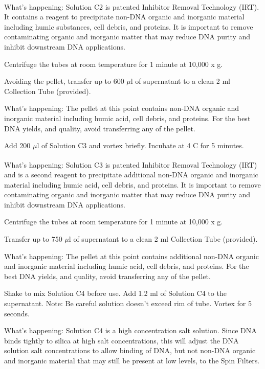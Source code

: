 \documentclass[12pt]{../SOP4_alpha}\usepackage[]{graphicx}\usepackage[]{xcolor}
\begin{document}
What's happening: Solution C2 is patented Inhibitor Removal Technology\textsuperscript{\textregistered} (IRT). It contains a reagent to precipitate non-DNA organic and inorganic material including humic substances, cell debris, and proteins. It is important to remove contaminating organic and inorganic matter that may reduce
DNA purity and inhibit downstream DNA applications.

\NP Centrifuge the tubes at room temperature for 1 minute at 10,000 x g.

\NP Avoiding the pellet, transfer up to 600 $\mu$l of supernatant to a clean 2 ml Collection Tube (provided).

\noindent What's happening: The pellet at this point contains non-DNA organic and inorganic material including humic acid, cell debris, and proteins. For the best DNA yields, and quality, avoid transferring any of the pellet.

\NP Add 200 $\mu$l of Solution C3 and vortex briefly. Incubate at 4 \degree C for 5 minutes.

\noindent What's happening: Solution C3 is patented Inhibitor Removal Technology\textsuperscript{\textregistered} (IRT) and is a second reagent to precipitate additional non-DNA organic and inorganic material including humic acid, cell debris, and proteins. It is important to remove contaminating organic and inorganic matter that may reduce DNA purity and inhibit downstream DNA applications.

\NP Centrifuge the tubes at room temperature for 1 minute at 10,000 x g.

\NP Transfer up to 750 $\mu$l of supernatant to a clean 2 ml Collection Tube (provided).

\noindent What's happening: The pellet at this point contains additional non-DNA organic and inorganic material including humic acid, cell debris, and proteins. For the best DNA yields, and quality, avoid transferring any of the pellet.

\NP Shake to mix Solution C4 before use. Add 1.2 ml of Solution C4 to the supernatant. Note: Be careful solution doesn't exceed rim of tube. Vortex for 5 seconds.

\noindent What's happening: Solution C4 is a high concentration salt solution. Since DNA binds tightly to silica at high salt concentrations, this will adjust the DNA solution salt concentrations to allow binding of DNA, but not non-DNA organic and inorganic material that may still be present at low levels, to the Spin Filters.
\end{document}
